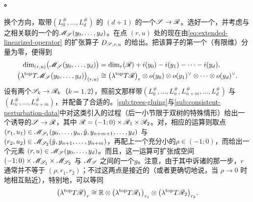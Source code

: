 \paragraph{\trPointedDisc\trFamily。}\label{sub:families-pointed-discs}
换个方向，取带\trBrane\trLabel{}$(L_0^{\#},\ldots,L_d^{\#})$ 的 $(d{+}1)$ \trPointedDisc{}的一个\trFamily{}$\mathscr{S}\to\mathscr{R}$。选好一个\trPerturbationDatum，并考虑与之相关联的一个\trParametrization{}的\trModuliSpace{}$\mathscr{M}_{\mathscr{S}}(y_0,\ldots,y_d)$。在\trRegular{}点 $(r,u)$ 处的\trTangentSpace{}现在由\eqref{eq:extended-linearized-operator} 的扩张算子 $D_{\mathscr{S},r,u}$ 的\trKernel{}给出。把该算子的第一个（有限维）分量\trDeformation{}为零，便得到
\begin{equation}\label{eq:family-moduli-dimension}
\begin{split}
\dim_{(r,u)}\bigl(\mathscr{M}_{\mathscr{S}}(y_0,\ldots,y_d)\bigr)
&=\dim_r(\mathscr{R})+i(y_0)-i(y_1)-\cdots-i(y_d),\\
\bigl(\lambda^{\mathrm{top}}T\mathscr{M}_{\mathscr{S}}(y_0,\ldots,y_d)\bigr)_{(r,u)}
&\cong\bigl(\lambda^{\mathrm{top}}T\mathscr{R}\bigr)_r\otimes o(y_0)\otimes o(y_1)^{\vee}\otimes\cdots\otimes o(y_d)^{\vee}.
\end{split}
\end{equation}
设有两个\trFamily{}$\mathscr{S}_k\to\mathscr{R}_k$（$k=1,2$），照前文那样带\trLabel{}$(L_0^{\#},\ldots,L_n^{\#},L_{n+m}^{\#},\ldots,L_d^{\#})$ 与 $(L_n^{\#},\ldots,L_{n+m}^{\#})$，并配备了合适的\trPerturbationDatum。\cref{sub:trees-gluing}与\cref{sub:consistent-perturbation-data}中对这类\trFamily{}引入的\trGluing{}过程（后一小节限于双\trVertex{}树的特殊情形）给出一个诱导的\trFamily{}$\mathscr{S}\to\mathscr{R}$，其中 $\mathscr{R}=(-1;0)\times\mathscr{R}_1\times\mathscr{R}_2$。对\trInhomogeneous\trPseudoholomorphicMap，相应的\trGluing{}运算则取\trRegular{}点 $(r_1,u_1)\in\mathscr{M}_{\mathscr{S}_1}(y_0,\ldots,y_n,\tilde{y},y_{n+m+1},\ldots,y_d)$ 与 $(r_2,u_2)\in\mathscr{M}_{\mathscr{S}_2}(\tilde{y},y_{n+1},\ldots,y_{n+m})$，再配上一个充分小的\trGluingParameter{}$\rho\in(-1;0)$，而给出一个元素 $(r,u)\in\mathscr{M}_{\mathscr{S}}(y_0,\ldots,y_d)$。而且，这一运算可扩张成空间 $(-1;0)\times\mathscr{M}_{\mathscr{S}_1}\times\mathscr{M}_{\mathscr{S}_2}$ 与 $\mathscr{M}_{\mathscr{S}}$ 之间的一个\trLocalDiffeomorphism{}$g$。注意，由于其中诉诸\trImplicitFunctionTheorem{}的那一步，$r$ 通常并不等于 $(\rho,r_1,r_2)$；不过这两点是接近的（或者更确切地说，当 $\rho\to 0$ 时\trAsymptotic{}地相互贴近），特别地，可以等同
\begin{equation}\label{eq:family-gluing-tangent}
\bigl(\lambda^{\mathrm{top}}T\mathscr{R}\bigr)_r
\cong\mathbb{R}\otimes\bigl(\lambda^{\mathrm{top}}T\mathscr{R}_1\bigr)_{r_1}\otimes\bigl(\lambda^{\mathrm{top}}T\mathscr{R}_2\bigr)_{r_2}.
\end{equation}
